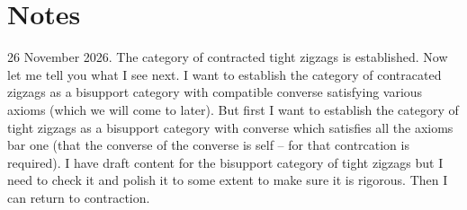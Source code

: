 \section{Notes}
\begin{aside}
26 November 2026.
The category of contracted tight zigzags is established.
Now let me tell you what I see next. I want to establish the category of contracated zigzags as a bisupport category with compatible converse satisfying various axioms (which we will come to later). But first I want to establish the category of tight zigzags as a bisupport category with converse which satisfies all the axioms bar one (that the converse of the converse is self -- for that contrcation is required). I have draft content for the bisupport category of tight zigzags but I need to check it and polish it to some extent to make sure it is rigorous. Then I can return to contraction.
\end{aside}

